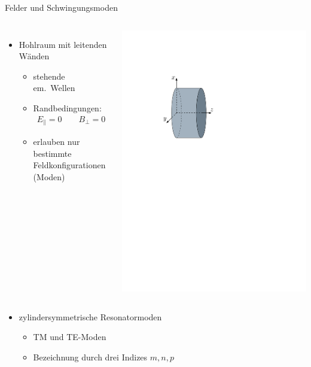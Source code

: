 \documentclass[12pt,xcolor=dvipsnames,professionalfonts]{beamer}
\begin{document}
\begin{frame}{Felder und Schwingungsmoden}
	\begin{columns}[T]
		\begin{itemize}
			\item Hohlraum mit leitenden Wänden
			\begin{itemize}
				\setlength\itemsep{0.25em}
				
				\item stehende em.\ Wellen
				
				\item Randbedingungen:
				\begin{align*}
				E_\parallel = 0 \qquad B_\perp = 0
				\end{align*}
				
				\item erlauben nur bestimmte Feldkonfigurationen (Moden)
			\end{itemize}
		\end{itemize}
		\centering
		\includegraphics[scale=0.6]{./figures/pillbox.pdf}
	\end{columns}
	\vfill
	\begin{itemize}
		\item zylindersymmetrische Resonatormoden
		\begin{itemize}
			\setlength\itemsep{0.25em}
			\item TM und TE-Moden
			\item Bezeichnung durch drei Indizes $m, n, p$
		\end{itemize}
		

\end{itemize}
\end{frame}
\end{document}
